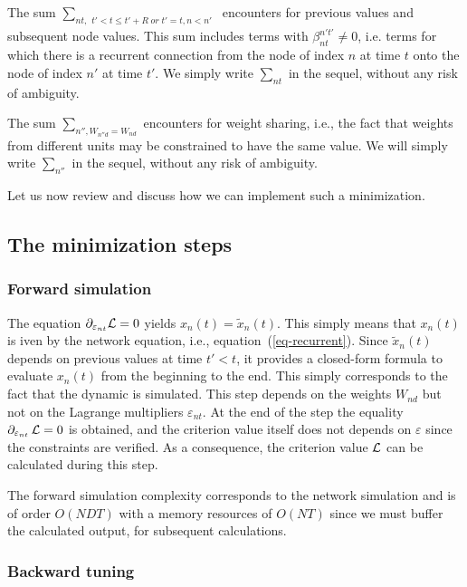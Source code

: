 The sum $\sum_{nt, \begin{array}{c} t' < t \leq t' + R \;or\; t' = t, n < n'\end{array}}$ encounters for previous values and subsequent node values. This sum includes terms with $\beta_{nt}^{n't'} \neq 0$, i.e. terms for which there is a recurrent connection from the node of index $n$ at time $t$ onto the node of index $n'$ at time $t'$. We simply write $\sum_{nt}$ in the sequel, without any risk of ambiguity.

The sum $\sum_{n'', W_{n''d} = W_{nd}}$ encounters for weight sharing, i.e., the fact that weights from different units may be constrained to have the same value. We will simply write $\sum_{n''}$ in the sequel, without any risk of ambiguity.

Let us now review and discuss how we can implement such a minimization.

\subsection*{The minimization steps}

\subsubsection*{Forward simulation}

The equation $\partial_{\varepsilon_{nt}} {\cal L} = 0$ yields $x_n(t) = \tilde{x}_n(t)$. This simply means that $x_n(t)$ is iven by the network equation, i.e., equation~(\ref{eq-recurrent}). Since $\tilde{x}_n(t)$ depends on previous values at time $t' < t$, it provides a closed-form formula to evaluate $x_n(t)$ from the beginning to the end. This simply corresponds to the fact that the dynamic is simulated. This step depends on the weights $W_{nd}$ but not on the Lagrange multipliers $\varepsilon_{nt}$. At the end of the step the equality $\partial_{\varepsilon_{nt}} \, {\cal L} = 0$ is obtained, and the criterion value itself does not depends on $\varepsilon$ since the constraints are verified. As a consequence, the criterion value ${\cal L}$ can be calculated during this step.

The forward simulation complexity corresponds to the network simulation and is of order $O(N D T)$ with a memory resources of $O(N T)$ since we must buffer the calculated output,  for subsequent calculations.

\subsubsection*{Backward tuning}

